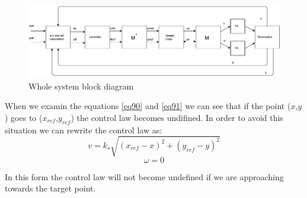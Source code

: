 \begin{figure} 
\centering
 	\includegraphics[width=1\textwidth]{figures/cartWxy.pdf}
	
	
	\caption{Whole system block diagram} 
 	\label{fig:wholesystem} 
\end{figure}

When we examin the equations \ref{eq90} and \ref{eq91} we can see that if the point ($x$,$y$) goes to ($x_{ref}$,$y_{ref}$) the control law becomes undifined. In order to avoid this situation we can rewrite the control law as:
\begin{equation} \label{eq96}
v=k_{s} \sqrt{(x_{ref}-x)^2+(y_{ref}-y)^2}
\end{equation}
\begin{equation} \label{eq97}
\omega = 0
\end{equation}

In this form the control law will not become undefined if we are approaching towards the target point.